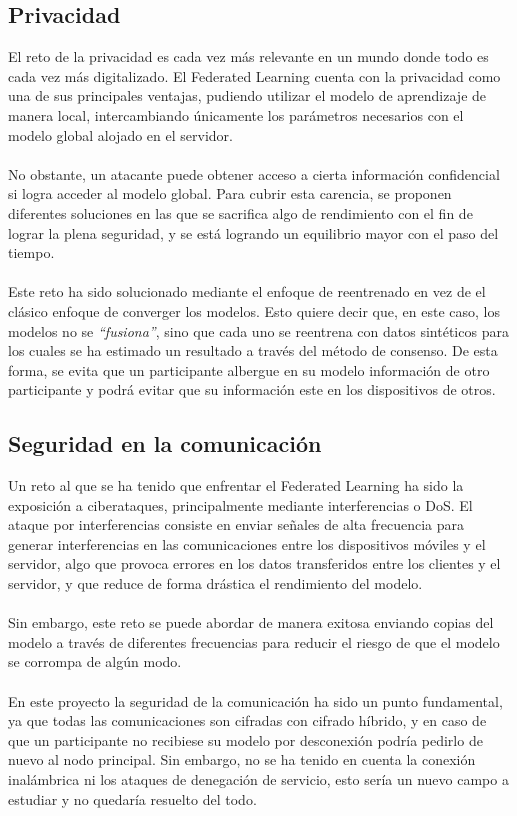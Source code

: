 \subsection{Privacidad}
El reto de la privacidad es cada vez más relevante en un mundo donde todo es cada vez más digitalizado. El Federated Learning cuenta con la privacidad como una de sus principales ventajas, pudiendo utilizar el modelo de aprendizaje de manera local, intercambiando únicamente los parámetros necesarios con el modelo global alojado en el servidor. 
\\ \\
No obstante, un atacante puede obtener acceso a cierta información confidencial si logra acceder al modelo global. Para cubrir esta carencia, se proponen diferentes soluciones en las que se sacrifica algo de rendimiento con el fin de lograr la plena seguridad, y se está logrando un equilibrio mayor con el paso del tiempo.
\\ \\
Este reto ha sido solucionado mediante el enfoque de reentrenado en vez de el clásico enfoque de converger los modelos. Esto quiere decir que, en este caso, los modelos no se \textit{``fusiona''}, sino que cada uno se reentrena con datos sintéticos para los cuales se ha estimado un resultado a través del método de consenso. De esta forma, se evita que un participante albergue en su modelo información de otro participante y podrá evitar que su información este en los dispositivos de otros.

\subsection{Seguridad en la comunicación}
Un reto al que se ha tenido que enfrentar el Federated Learning ha sido la exposición a ciberataques, principalmente mediante interferencias o DoS. El ataque por interferencias consiste en enviar señales de alta frecuencia para generar interferencias en las comunicaciones entre los dispositivos móviles y el servidor, algo que provoca errores en los datos transferidos entre los clientes y el servidor, y que reduce de forma drástica el rendimiento del modelo. 
\\ \\
Sin embargo, este reto se puede abordar de manera exitosa enviando copias del modelo a través de diferentes frecuencias para reducir el riesgo de que el modelo se corrompa de algún modo.
\\ \\
En este proyecto la seguridad de la comunicación ha sido un punto fundamental, ya que todas las comunicaciones son cifradas con cifrado híbrido, y en caso de que un participante no recibiese su modelo por desconexión podría pedirlo de nuevo al nodo principal. Sin embargo, no se ha tenido en cuenta la conexión inalámbrica ni los ataques de denegación de servicio, esto sería un nuevo campo a estudiar y no quedaría resuelto del todo.  

